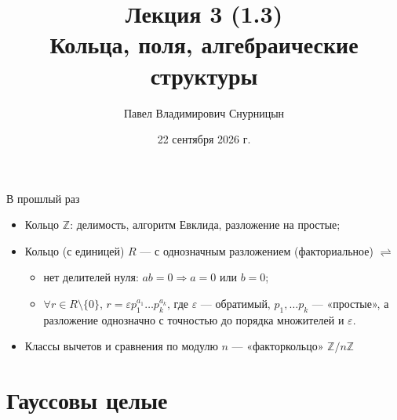 \documentclass[serif, aspectratio=169]{beamer}
\author{Павел Владимирович Снурницын}
\title{Лекция 3 (1.3)\\ Кольца, поля, алгебраические структуры}
\institute{к.ф.-м.н., с.н.с., ИБ ВМК}
\date{\small 22 сентября 2026 г.}
\begin{document}
\begin{frame}
    \titlepage
\end{frame}
\note{}

\begin{frame}{В прошлый раз}
    \begin{itemize}
        \item Кольцо $\mathbb{Z}$: делимость, алгоритм Евклида, разложение на простые;
        \item Кольцо (с единицей) $R$ --- с однозначным разложением (факториальное) $\rightleftharpoons$
        \begin{itemize}[<.->]
            \item нет делителей нуля: $ab=0 \Rightarrow a=0$ или $b=0$;
            \item $\forall r \in R\setminus\{0\}$, $r=\varepsilon p_1^{a_1} \dots p_k^{a_k}$, где $\varepsilon$ --- обратимый, $p_1,\dots p_k$ --- «простые», а разложение однозначно с точностью до порядка множителей и $\varepsilon$.
        \end{itemize}
        \item Классы вычетов и сравнения по модулю $n$ --- «факторкольцо» $\mathbb{Z}/n\mathbb{Z}$
    \end{itemize}
\end{frame}

\section{Гауссовы целые}
\end{document}
